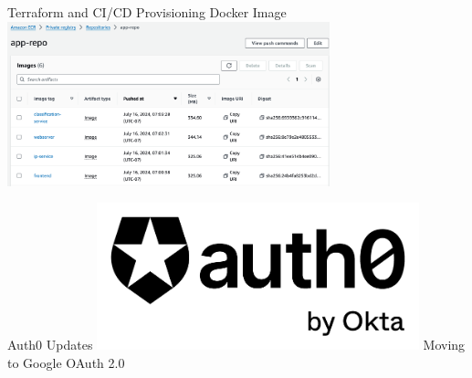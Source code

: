 


\begin{frame}{Terraform and CI/CD}
    Provisioning
    Docker Image
    \centering
    \includegraphics[height=0.7\textheight,width=0.7\textwidth,keepaspectratio]{images/mm_ecr.png} 
\end{frame}

\begin{frame}{Auth0 Updates}
    \centering
    \includegraphics[height=0.7\textheight,width=0.7\textwidth,keepaspectratio]{images/mm_auth0.png}
    Moving to Google OAuth 2.0
\end{frame}





